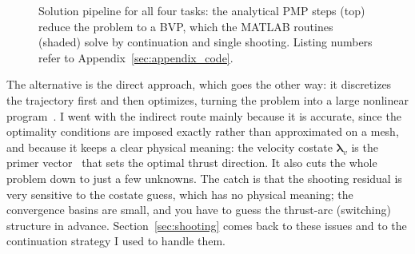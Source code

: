 \documentclass[../main.tex]{subfiles}
\begin{document}
\begin{figure}[H]
\centering
{}
\caption{Solution pipeline for all four tasks: the analytical PMP steps (top) reduce the problem to a BVP, which the MATLAB routines (shaded) solve by continuation and single shooting. Listing numbers refer to Appendix~\ref{sec:appendix_code}.}
\label{fig:pipeline}
\end{figure}

The alternative is the direct approach, which goes the other way: it discretizes the trajectory first and then optimizes, turning the problem into a large nonlinear program~\cite[Sec.~4.12.7]{betts2010}. I went with the indirect route mainly because it is accurate, since the optimality conditions are imposed exactly rather than approximated on a mesh, and because it keeps a clear physical meaning: the velocity costate $\boldsymbol{\lambda}_v$ is the primer vector~\cite[Lecture~6]{dclvnotes} that sets the optimal thrust direction. It also cuts the whole problem down to just a few unknowns. The catch is that the shooting residual is very sensitive to the costate guess, which has no physical meaning; the convergence basins are small, and you have to guess the thrust-arc (switching) structure in advance. Section~\ref{sec:shooting} comes back to these issues and to the continuation strategy I used to handle them.
\end{document}
